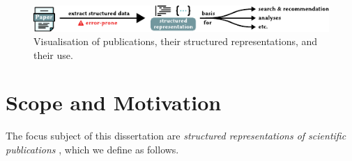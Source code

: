 

\begin{figure}[h]
  \centering
  \includegraphics[width=\linewidth]{figures/introduction/structured_representations_of_publucations}
  \caption[test]{Visualisation of publications, their structured representations, and their use.}
  \label{fig:introduction-structreps}
\end{figure}

\section{Scope and Motivation}


% 


The focus subject of this dissertation are \textit{structured representations of scientific publications}%
, which we define as follows.

